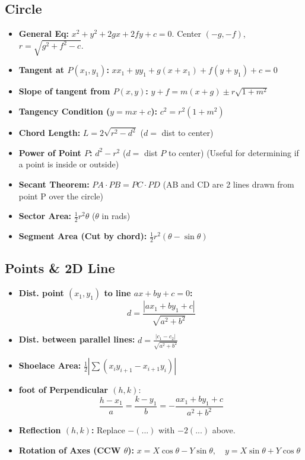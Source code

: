 \subsection{Circle}
\begin{itemize}[leftmargin=*]
    \item \textbf{General Eq:} $x^2+y^2+2gx+2fy+c=0$. Center $(-g, -f)$, $r=\sqrt{g^2+f^2-c}$.
    \item \textbf{Tangent at $P(x_1, y_1)$:} $xx_1 + yy_1 + g(x+x_1) + f(y+y_1) + c = 0$
    \item \textbf{Slope of tangent from $P(x, y)$:} $y + f = m(x + g) \pm r\sqrt{1 + m^2}$
    \item \textbf{Tangency Condition ($y=mx+c$):} $c^2 = r^2(1+m^2)$
    \item \textbf{Chord Length:} $L = 2\sqrt{r^2 - d^2}$ ($d = $ dist to center)
    \item \textbf{Power of Point $P$:} $d^2 - r^2$ ($d = $ dist $P$ to center) (Useful for determining if a point is inside or outside)
    \item \textbf{Secant Theorem:} $PA \cdot PB = PC \cdot PD$ (AB and CD are 2 lines drawn from point P over the circle)
    \item \textbf{Sector Area:} $\frac{1}{2}r^2\theta$ ($\theta$ in rads)
    \item \textbf{Segment Area (Cut by chord):} $\frac{1}{2}r^2(\theta - \sin\theta)$
\end{itemize}
\subsection{Points \& 2D Line}
\begin{itemize}[leftmargin=*]
    \item \textbf{Dist. point $(x_1, y_1)$ to line $ax+by+c=0$:} 
    \[ d = \frac{|ax_1+by_1+c|}{\sqrt{a^2+b^2}} \]
    \item \textbf{Dist. between parallel lines:} $d = \frac{|c_1-c_2|}{\sqrt{a^2+b^2}}$
    \item \textbf{Shoelace Area:} $\frac{1}{2} | \sum (x_i y_{i+1} - x_{i+1} y_i) |$
    \item \textbf{foot of Perpendicular $(h,k)$}:
    \[ \frac{h-x_1}{a} = \frac{k-y_1}{b} = -\frac{ax_1+by_1+c}{a^2+b^2} \]
    \item \textbf{Reflection $(h,k)$:} Replace $- (...)$ with $-2 (...)$ above.
    \item \textbf{Rotation of Axes (CCW $\theta$):}
    $x = X\cos\theta - Y\sin\theta, \quad y = X\sin\theta + Y\cos\theta$
\end{itemize}
